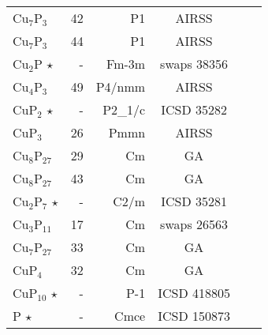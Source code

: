 \begin{tabular}{l r r c l l}
  Cu$_\text{7}$P$_\text{3}$               &          42          &          P1          &             AIRSS              &                                \\
  Cu$_\text{7}$P$_\text{3}$               &          44          &          P1          &             AIRSS              &                                \\
        Cu$_\text{2}$P          $\star$   &          -           &       Fm-3m         &          swaps 38356           &                                \\
  Cu$_\text{4}$P$_\text{3}$               &          49          &        P4/nmm        &             AIRSS              &                                \\
        CuP$_\text{2}$          $\star$   &          -           &       P2_1/c        &           ICSD 35282           &                                \\
        CuP$_\text{3}$                    &          26          &         Pmmn         &             AIRSS              &                                \\
  Cu$_\text{8}$P$_\text{27}$              &          29          &          Cm          &               GA               &                                \\
  Cu$_\text{8}$P$_\text{27}$              &          43          &          Cm          &               GA               &                                \\
  Cu$_\text{2}$P$_\text{7}$     $\star$   &          -           &        C2/m         &           ICSD 35281           &                                \\
  Cu$_\text{3}$P$_\text{11}$              &          17          &          Cm          &          swaps 26563           &                                \\
  Cu$_\text{7}$P$_\text{27}$              &          33          &          Cm          &               GA               &                                \\
        CuP$_\text{4}$                    &          32          &          Cm          &               GA               &                                \\
       CuP$_\text{10}$          $\star$   &          -           &        P-1          &          ICSD 418805           &                                \\
              P                 $\star$   &          -           &        Cmce         &          ICSD 150873           &                                \\
\end{tabular}